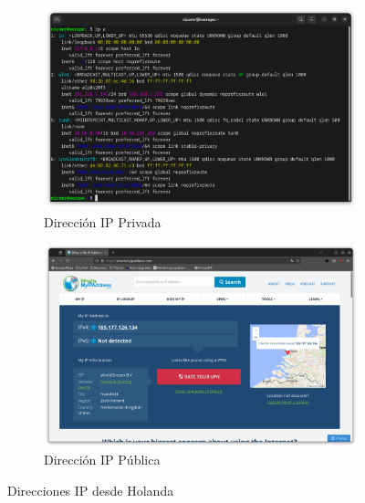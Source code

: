 \begin{figure}[H]
    \centering
    \begin{subfigure}{.5\textwidth}
        \centering
        \includegraphics[width=\linewidth]{IP-Privada-Holanda.png}
        \caption{Dirección IP Privada}
    \end{subfigure}%
    \begin{subfigure}{.5\textwidth}
        \centering
        \includegraphics[width=\linewidth]{IP-Publica-Holanda.png}
        \caption{Dirección IP Pública}
    \end{subfigure}
    \caption{Direcciones IP desde Holanda}
    \label{fig:IPs-Holanda}
\end{figure}

